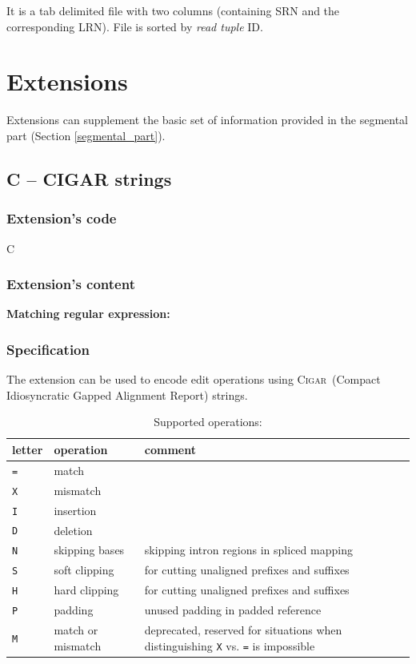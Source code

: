 \documentclass[10pt,a4paper]{article}
\newcommand{\re}[1]{\framebox{\mbox{\texttt{#1}}}}
\newcommand{\mre}[1]{\hspace{0.5cm}\textbf{Matching regular expression:} \re{#1}\smallskip}
\newcommand{\CIGAR}{\textsc{Cigar}}
\begin{document}
\smallskip

It is a
tab delimited file with two columns (containing SRN and the corresponding LRN). File is sorted by {\em read tuple} ID.



\section{Extensions}
\label{sec:extensions}
\appendix

Extensions can supplement the basic set of information provided in the segmental part (Section \ref{segmental_part}).

\subsection*{C -- CIGAR strings}

\subsubsection*{Extension's code}

\hspace{0.5cm} C

\subsubsection*{Extension's content}

\mre{\char94(?:([0-9]+[=XIDNSHPM]+)(?:,(?!\char36)|\char36))+\char36}


\subsubsection*{Specification}

The extension can be used to encode edit operations 
using \CIGAR\  (Compact Idiosyncratic Gapped Alignment Report) strings.

\medskip

\begin{table}[h]
\centering
\caption*{Supported operations:}
\begin{tabular}{|l|l|p{8cm}|}
	\hline
	letter & operation & comment 
	\\\hline
	\texttt{=} & match & \\
	\texttt{X} & mismatch & \\
	\texttt{I} & insertion & \\
	\texttt{D} & deletion &	\\
	\texttt{N} & skipping bases & skipping intron regions in spliced mapping \\
	\texttt{S} & soft clipping &
		for cutting unaligned prefixes and suffixes \\
	\texttt{H} & hard clipping &
		for cutting unaligned prefixes and suffixes \\
	\texttt{P} & padding & unused padding in padded reference\\
	\texttt{M} & match or mismatch	& deprecated, reserved for situations when distinguishing \texttt{X} vs. \texttt{=}
is impossible
	\\\hline
\end{tabular}
\end{table}
\end{document}

